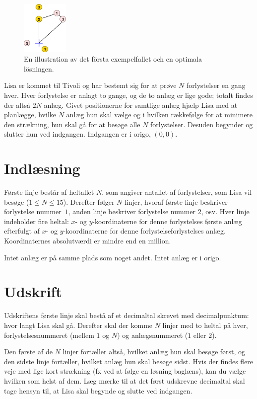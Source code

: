 \begin{figure}[h]
    \centering
    \includegraphics[width=0.2\textwidth]{tivoli}
    \caption{En illustration av det första exempelfallet och en optimala lösningen.}
\end{figure}
Lisa er kommet til Tivoli og har bestemt sig for at prøve $N$ forlystelser en gang hver.
Hver forlystelse er anlagt to gange, og de to anlæg er lige gode; totalt findes der altså $2N$ anlæg.
Givet positionerne for samtlige anlæg hjælp Lisa med at planlægge, hvilke $N$ anlæg hun skal vælge og i hvilken rækkefølge for at minimere den strækning, hun skal gå for at besøge alle $N$ forlystelser.
Desuden begynder og slutter hun ved indgangen.
Indgangen er i origo, $(0,0)$.

\section*{Indlæsning}
Første linje består af heltallet $N$, som angiver antallet af forlystelser, som Lisa vil besøge ($1 \le N \le 15$).
Derefter følger $N$ linjer, hvoraf første linje beskriver forlystelse  nummer~$1$, anden linje beskriver forlystelse nummer $2$, osv.
Hver linje indeholder fire heltal: $x$- og $y$-koordinaterne for denne forlystelses første anlæg efterfulgt af $x$- og $y$-koordinaterne for denne forlystelseforlystelses anlæg.
Koordinaternes absolutværdi er mindre end en million.

Intet anlæg er på samme plads som noget andet.
Intet anlæg er i origo.

\section*{Udskrift}
Udskriftens første linje skal bestå af et decimaltal skrevet med decimalpunktum: hvor langt Lisa skal gå. 
Derefter skal der komme $N$ linjer med to heltal på hver, forlystelsesnummeret (mellem $1$ og $N$) og anlægsnummeret ($1$ eller $2$).

Den første af de $N$ linjer fortæller altså, hvilket anlæg hun skal besøge først, og den sidste linje fortæller, hvilket anlæg hun skal besøge sidst.
Hvis der findes flere veje med lige kort strækning (fx ved at følge en løsning baglæns), kan du vælge hvilken som helst af dem.
Læg mærke til at det først udskrevne decimaltal skal tage hensyn til, at Lisa skal begynde og slutte ved indgangen.

